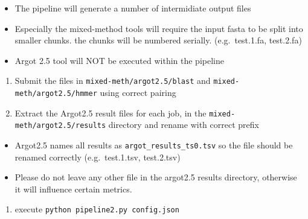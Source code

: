 \begin{itemize}

 \item
       The pipeline will generate a number of intermidiate output files
 \item
       Especially the mixed-method tools will require the input fasta to be
       split into smaller chunks. the chunks will be numbered serially.
       (e.g.~test.1.fa, test.2.fa)
 \item
       Argot 2.5 tool will NOT be executed within the pipeline
\end{itemize}

\begin{enumerate}
 \def\labelenumi{\arabic{enumi}.}
 \setcounter{enumi}{3}

 \item
       Submit the files in \texttt{mixed-meth/argot2.5/blast} and
       \texttt{mixed-meth/argot2.5/hmmer} using correct pairing
 \item
       Extract the Argot2.5 result files for each job, in the
       \texttt{mixed-meth/argot2.5/results} directory and rename with correct
       prefix
\end{enumerate}

\begin{itemize}

 \item
       Argot2.5 names all results as \texttt{argot\_results\_ts0.tsv} so the
       file should be renamed correctly (e.g.~test.1.tsv, test.2.tsv)
 \item
       Please do not leave any other file in the argot2.5 results directory,
       otherwise it will influence certain metrics.
\end{itemize}

\begin{enumerate}
 \def\labelenumi{\arabic{enumi}.}
 \setcounter{enumi}{5}

 \item
       execute \texttt{python\ pipeline2.py\ config.json}
\end{enumerate}



